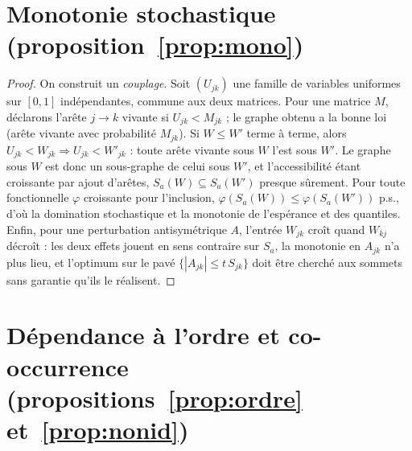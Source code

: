 \section*{Monotonie stochastique (proposition~\ref{prop:mono})}

\begin{proof}
On construit un \emph{couplage}. Soit $(U_{jk})$ une famille de variables uniformes sur $[0,1]$
indépendantes, commune aux deux matrices. Pour une matrice $M$, déclarons l'arête $j\to k$
vivante si $U_{jk}<M_{jk}$ ; le graphe obtenu a la bonne loi (arête vivante avec probabilité
$M_{jk}$). Si $W\le W'$ terme à terme, alors $U_{jk}<W_{jk}\Rightarrow U_{jk}<W'_{jk}$ : toute
arête vivante sous $W$ l'est sous $W'$. Le graphe sous $W$ est donc un sous-graphe de celui sous
$W'$, et l'accessibilité étant croissante par ajout d'arêtes, $S_a(W)\subseteq S_a(W')$ presque
sûrement. Pour toute fonctionnelle $\varphi$ croissante pour l'inclusion,
$\varphi(S_a(W))\le\varphi(S_a(W'))$ p.s., d'où la domination stochastique et la monotonie de
l'espérance et des quantiles. Enfin, pour une perturbation antisymétrique $A$, l'entrée $W_{jk}$
croît quand $W_{kj}$ décroît : les deux effets jouent en sens contraire sur $S_a$, la monotonie
en $A_{jk}$ n'a plus lieu, et l'optimum sur le pavé $\{|A_{jk}|\le t\,S_{jk}\}$ doit être
cherché aux sommets sans garantie qu'ils le réalisent.
\end{proof}

\section*{Dépendance à l'ordre et co-occurrence (propositions~\ref{prop:ordre} et~\ref{prop:nonid})}

